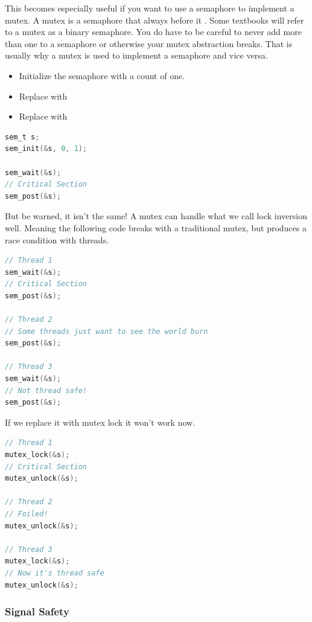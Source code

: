 This becomes especially useful if you want to use a semaphore to implement a mutex.
A mutex is a semaphore that always  before it .
Some textbooks will refer to a mutex as a binary semaphore.
You do have to be careful to never add more than one to a semaphore or otherwise your mutex abstraction breaks.
That is usually why a mutex is used to implement a semaphore and vice versa.

\begin{itemize}
\item Initialize the semaphore with a count of one.
\item Replace  with 
\item Replace  with 
\end{itemize}

\begin{lstlisting}[language=C]
sem_t s;
sem_init(&s, 0, 1);

sem_wait(&s);
// Critical Section
sem_post(&s);
\end{lstlisting}

But be warned, it isn't the same!
A mutex can handle what we call lock inversion well.
Meaning the following code breaks with a traditional mutex, but produces a race condition with threads.

\begin{lstlisting}[language=C]
// Thread 1
sem_wait(&s);
// Critical Section
sem_post(&s);

// Thread 2
// Some threads just want to see the world burn
sem_post(&s);

// Thread 3
sem_wait(&s);
// Not thread safe!
sem_post(&s);
\end{lstlisting}

If we replace it with mutex lock it won't work now.

\begin{lstlisting}[language=C]
// Thread 1
mutex_lock(&s);
// Critical Section
mutex_unlock(&s);

// Thread 2
// Foiled!
mutex_unlock(&s);

// Thread 3
mutex_lock(&s);
// Now it's thread safe
mutex_unlock(&s);
\end{lstlisting}

\subsubsection{Signal Safety}


